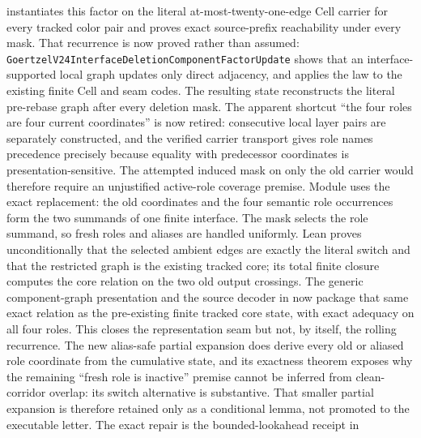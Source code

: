 \documentclass[11pt]{article}
\theoremstyle{definition}
\begin{document}
\begin{description}
        instantiates this factor on the literal at-most-twenty-one-edge Cell
        carrier for every tracked color pair and proves exact source-prefix
        reachability under every mask.  That recurrence is now proved rather
        than assumed:
        \texttt{GoertzelV24InterfaceDeletionComponentFactorUpdate} shows that
        an interface-supported local graph updates only direct adjacency, and
        applies the law to the existing finite Cell and seam codes.  The
        resulting state reconstructs the literal pre-rebase graph after every
        deletion mask.  The apparent shortcut ``the four roles are four
        current coordinates'' is now retired: consecutive local layer pairs
        are separately constructed, and the verified carrier transport gives
        role names precedence precisely because equality with predecessor
        coordinates is presentation-sensitive.  The attempted induced mask on
        only the old carrier would therefore require an unjustified active-role
        coverage premise.  Module
        uses the exact replacement: the old coordinates and the four semantic
        role occurrences form the two summands of one finite interface.  The
        mask selects the role summand, so fresh roles and aliases are handled
        uniformly.  Lean proves unconditionally that the selected ambient
        edges are exactly the literal switch and that the restricted graph is
        the existing tracked core; its total finite closure computes the core
        relation on the two old output crossings.  The generic component-graph
        presentation and the source decoder in
        now package that same exact relation as the pre-existing finite tracked
        core state, with exact adequacy on all four roles.  This closes the
        representation seam but not, by itself, the rolling recurrence.  The
        new alias-safe partial expansion does derive every old or aliased role
        coordinate from the cumulative state, and its exactness theorem exposes
        why the remaining ``fresh role is inactive'' premise cannot be inferred
        from clean-corridor overlap: its switch alternative is substantive.
        That smaller partial expansion is therefore retained only as a
        conditional lemma, not promoted to the executable letter.  The exact
        repair is the bounded-lookahead receipt in

\end{description}
\end{document}
